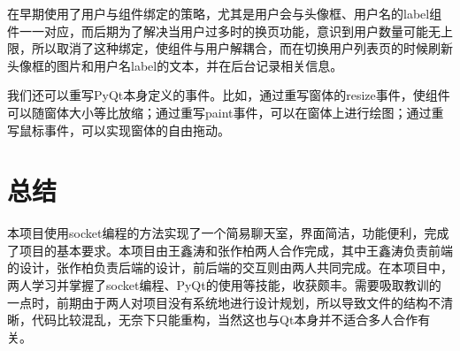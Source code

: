 \documentclass[12pt]{article} %
\begin{document}
\begin{sloppypar}
在早期使用了用户与组件绑定的策略，尤其是用户会与头像框、用户名的label组件一一对应，而后期为了解决当用户过多时的换页功能，意识到用户数量可能无上限，所以取消了这种绑定，使组件与用户解耦合，而在切换用户列表页的时候刷新头像框的图片和用户名label的文本，并在后台记录相关信息。

我们还可以重写PyQt本身定义的事件。比如，通过重写窗体的resize事件，使组件可以随窗体大小等比放缩；通过重写paint事件，可以在窗体上进行绘图；通过重写鼠标事件，可以实现窗体的自由拖动。

\section{总结}

本项目使用socket编程的方法实现了一个简易聊天室，界面简洁，功能便利，完成了项目的基本要求。本项目由王鑫涛和张作柏两人合作完成，其中王鑫涛负责前端的设计，张作柏负责后端的设计，前后端的交互则由两人共同完成。在本项目中，两人学习并掌握了socket编程、PyQt的使用等技能，收获颇丰。需要吸取教训的一点时，前期由于两人对项目没有系统地进行设计规划，所以导致文件的结构不清晰，代码比较混乱，无奈下只能重构，当然这也与Qt本身并不适合多人合作有关。




\end{sloppypar}
\end{document}
